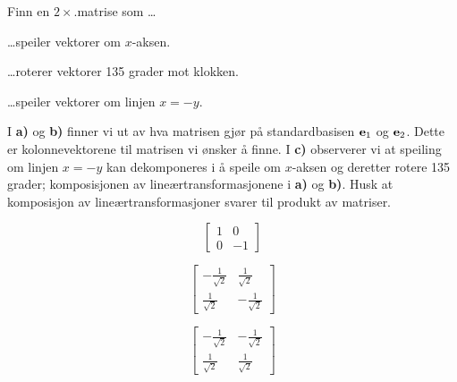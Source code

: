 \begin{oppgave}
Finn en $2\times$.matrise som \ldots
\begin{punkt}
\ldots speiler vektorer om $x$-aksen.
\end{punkt}
\begin{punkt}
\ldots roterer vektorer 135 grader mot klokken.
\end{punkt}
\begin{punkt}
\ldots speiler vektorer om linjen $x=-y$.
\end{punkt}
\end{oppgave}

\begin{losning}
I \textbf{a)} og \textbf{b)} finner vi ut av hva matrisen gjør på standardbasisen $\mathbf{e}_1$ og $\mathbf{e}_2$. Dette er kolonnevektorene til matrisen vi ønsker å finne. I \textbf{c)} observerer vi at speiling om linjen $x=-y$ kan dekomponeres i å speile om $x$-aksen og deretter rotere 135 grader; komposisjonen av lineærtransformasjonene i \textbf{a)} og \textbf{b)}. Husk at komposisjon av lineærtransformasjoner svarer til produkt av matriser.

\begin{punkt}
$$\begin{bmatrix}
1 & 0\\
0 & -1
\end{bmatrix}$$
\end{punkt}

\begin{punkt}
$$\begin{bmatrix}
-\frac{1}{\sqrt{2}} & \frac{1}{\sqrt{2}} \\
\frac{1}{\sqrt{2}}  & -\frac{1}{\sqrt{2}} 
\end{bmatrix}$$
\end{punkt}

\begin{punkt}
$$\begin{bmatrix}
-\frac{1}{\sqrt{2}} & -\frac{1}{\sqrt{2}} \\
\frac{1}{\sqrt{2}}  & \frac{1}{\sqrt{2}} 
\end{bmatrix}$$
\end{punkt}

\end{losning}


